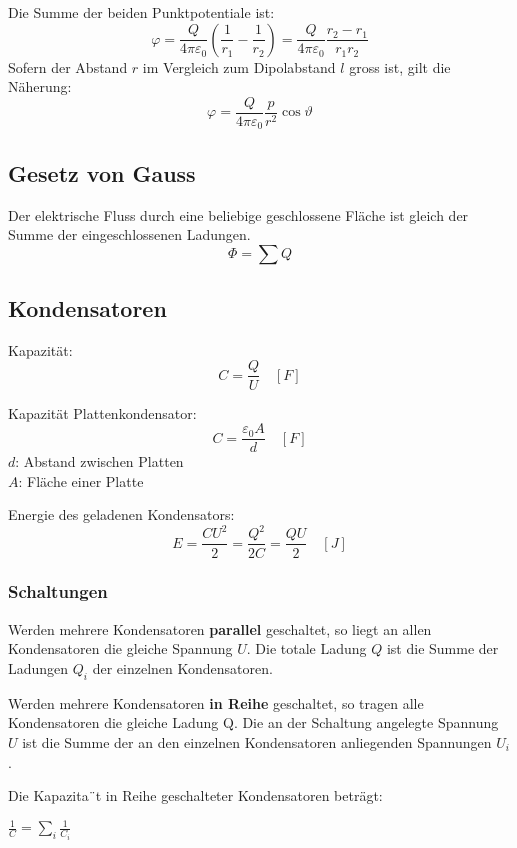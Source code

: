 \begin{center}

\end{center}

Die Summe der beiden Punktpotentiale ist:
\[
	\varphi
		= \frac{Q}{4\pi\varepsilon_0} \left(\frac{1}{r_1} - \frac{1}{r_2}\right)
		= \frac{Q}{4\pi\varepsilon_0} \frac{r_2 - r_1}{r_1 r_2}
\]
Sofern der Abstand $r$ im Vergleich zum Dipolabstand $l$ gross ist, gilt die
Näherung:
\[
	\varphi = \frac{Q}{4\pi\varepsilon_0} \frac{p}{r^2} \cos \vartheta
\]

\subsection{Gesetz von Gauss}

Der elektrische Fluss durch eine beliebige geschlossene Fläche ist gleich der
Summe der eingeschlossenen Ladungen.
\[
	\Phi = \sum Q
\]

\subsection{Kondensatoren}

Kapazität:
\[
	C = \frac{Q}{U} \quad \left[F\right]
\]

Kapazität Plattenkondensator:
\[
	C = \frac{\varepsilon_0 A}{d} \quad \left[F\right]
\]
$d$: Abstand zwischen Platten\\
$A$: Fläche einer Platte

Energie des geladenen Kondensators:
\[
	E = \frac{CU^2}{2} = \frac{Q^2}{2C} = \frac{QU}{2} \quad \left[J\right]
\]

\subsubsection{Schaltungen}

Werden mehrere Kondensatoren \textbf{parallel} geschaltet, so liegt an allen Kondensatoren die gleiche Spannung $U$. Die totale Ladung $Q$ ist die Summe der Ladungen $Q_i$ der einzelnen Kondensatoren.

Werden mehrere Kondensatoren \textbf{in Reihe} geschaltet, so tragen alle Kondensatoren die gleiche Ladung Q. Die an der Schaltung angelegte Spannung $U$ ist die Summe der an den einzelnen Kondensatoren anliegenden Spannungen $U_i$.

Die Kapazita¨t in Reihe geschalteter Kondensatoren beträgt:

$\frac{1}{C}=\sum_{i}{\frac{1}{C_i}}$

